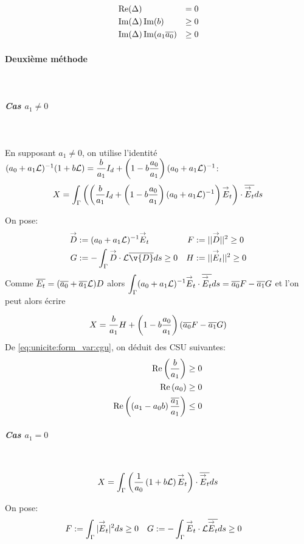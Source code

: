       \begin{align}
        &\operatorname{Re}(\Delta) &= 0\\
        &\operatorname{Im}(\Delta)\operatorname{Im}(b) &\ge 0\\
        &\operatorname{Im}(\Delta)\operatorname{Im}(a_1{\overline{a_0}})&\ge 0
      \end{align}

    \paragraph{Deuxième méthode}
      ~
      \subparagraph{Cas \(a_1\not=0\)}
        ~

        En supposant \(a_1 \not=0\), on utilise l'identité \((a_0 + a_1 \mathcal{L})^{-1}(1 + b \mathcal{L})  = \dfrac{b}{a_1} I_d + \left(1-b\dfrac{a_0}{a_1}\right)(a_0+a_1 \mathcal{L})^{-1}\):
        \[
          X = \int_\Gamma \left(\left(\dfrac{b}{a_1} I_d + \left(1-b\dfrac{a_0}{a_1}\right)(a_0+a_1 \mathcal{L})^{-1}\right){\overset{\rightarrow}{E}}_t\right) \cdot {\overline{{\overset{\rightarrow}{E}}_t}} ds
        \]

        On pose:
        \begin{align*}
          \vect D &:= (a_0 + a_1 \LL)^{-1}\vE_t & F&:= || \vect D || ^2 \ge 0  \\
          G&:= -\int_\Gamma \vect D \cdot \LL\conj{\v{D}} ds \ge 0 & H &:= || \vE_t || ^2 \ge 0
        \end{align*}
        Comme \({\overline{E_t}} = ({\overline{a_0}} + {\overline{a_1}}\mathcal{L})D\) alors \(\displaystyle\int_\Gamma (a_0 +a_1 \mathcal{L}) ^{-1}{\overset{\rightarrow}{E}}_t\cdot {\overline{{\overset{\rightarrow}{E}}_t}} ds = {\overline{a_0}} F - {\overline{a_1}} G\) et l'on peut alors écrire

        \begin{equation}
          \label{eq:unicite:form_var:decomp_cgu_ci1_a1}
          X = \dfrac{b}{a_1}H   + \left(1-b\dfrac{a_0}{a_1}\right)\left({\overline{a_0}} F - {\overline{a_1}} G\right)
        \end{equation}
        De \eqref{eq:unicite:form_var:cgu}, on déduit des CSU suivantes:
        \begin{align}
          \operatorname{Re}\left(\dfrac{b}{a_1}\right) \ge 0 \\
          \operatorname{Re}\left(a_0\right) \ge 0 \\
          \operatorname{Re}\left(\left(a_1-a_0 b\right)\dfrac{{\overline{a_1}}}{a_1}\right) \le 0
        \end{align}

      \subparagraph{Cas \(a_1=0\)}
        ~
        \[
          X = \int_\Gamma \left( \dfrac{1}{a_0}\left(1+b\mathcal{L}\right){\overset{\rightarrow}{E}}_t\right) \cdot {\overline{{\overset{\rightarrow}{E}}_t}} ds
        \]

        On pose:
        \begin{align*}
          F&:= \int_\Gamma | {\overset{\rightarrow}{E}}_t | ^2 ds \ge 0 & G &:= -\int_\Gamma {\overset{\rightarrow}{E}}_t \cdot \mathcal{L}{\overline{{\overset{\rightarrow}{E}}_t}} ds \ge 0
        \end{align*}


